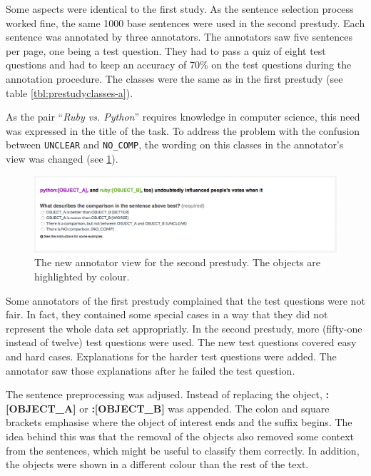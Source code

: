 Some aspects were identical to the first study. As the sentence selection process worked fine, the same 1000 base sentences were used in the second prestudy.  Each sentence was annotated by three annotators. The annotators saw five sentences per page, one being a test question. They had to pass a quiz of eight test questions and had to keep an accuracy of 70\% on the test questions during the annotation procedure. The classes were the same as in the first prestudy (see table \ref{tbl:prestudyclasses-a}).

As the pair \enquote{\emph{Ruby vs. Python}} requires knowledge in computer science, this need was expressed in the title of the task.
To address the problem with the confusion between \texttt{UNCLEAR} and \texttt{NO\_COMP}, the wording on this classes in the annotator's view was changed (see \ref{img:2_question}). 

\begin{figure}[h]
\centering
\includegraphics[width=1\textwidth]{images/prestudy/2_question}

\caption{The new annotator view for the second prestudy. The objects are highlighted by colour.}
\label{img:2_question}
\end{figure}

Some annotators of the first prestudy complained that the test questions were not fair. In fact, they contained some special cases in a way that they did not represent the whole data set appropriatly. In the second prestudy, more (fifty-one instead of twelve) test questions were used. The new test questions covered easy and hard cases. Explanations for the harder test questions were added. The annotator saw those explanations after he failed the test question.



The sentence preprocessing was adjused. Instead of replacing the object, \mbox{\textbf{{\color[HTML]{9A14B2}:{[}OBJECT\_A{]}}}} or \textbf{{\color[HTML]{6CB219}:{[}OBJECT\_B{]}}} was appended. The colon and square brackets emphasise where the object of interest ends and the suffix begins. The idea behind this was that the removal of the objects also removed some context from the sentences, which might be useful to classify them correctly. In addition, the objects were shown in a different colour than the rest of the text.\newline



